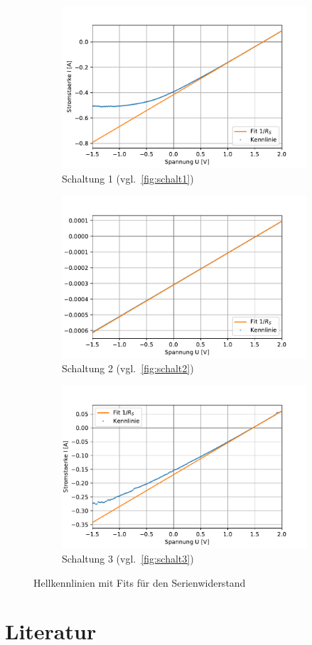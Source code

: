 \documentclass[slug=SZ, room=Hermann-Krone-Bau\,\ Labor\ 1.25, supervisor=Martin\ Kroll]{../../Lab_Report_LaTeX/lab_report}
\begin{document}
\begin{figure}[H]\centering
        \begin{subfigure}[b]{1\textwidth}\centering
                \includegraphics[width=.5\columnwidth]{figs/python/3x3_schaltung_2_rs.pdf}
                \caption{Schaltung 1 (vgl.~\ref{fig:schalt1})}
                \label{diag:hellschalt1fit1}
        \end{subfigure}
        \begin{subfigure}[b]{1\textwidth}\centering
                \includegraphics[width=.5\columnwidth]{figs/python/3x3_schaltung_3_rs.pdf}
                \caption{Schaltung 2 (vgl.~\ref{fig:schalt2})}
                \label{diag:hellschalt2fit1}
        \end{subfigure}
        \begin{subfigure}[b]{1\textwidth}\centering
                \includegraphics[width=.5\columnwidth]{figs/python/3x3_schaltung_4_rs.pdf}
                \caption{Schaltung 3 (vgl.~\ref{fig:schalt3})}
                \label{diag:hellschalt3fit1}
        \end{subfigure}
        \caption{Hellkennlinien mit Fits f\"ur den Serienwiderstand}
        \label{fig:hellkennfit1}
\end{figure}

\section{Literatur}

\label{sec:literatur}

\printbibliography
\end{document}

